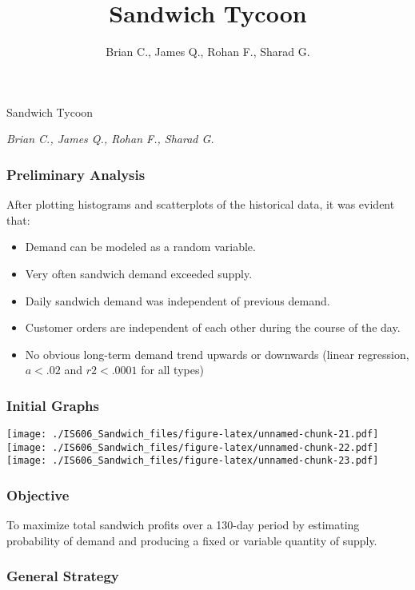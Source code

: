 \documentclass[]{article}
\title{Sandwich Tycoon}
\author{Brian C., James Q., Rohan F., Sharad G.}
\date{}
\begin{document}
\begin{center}
\huge Sandwich Tycoon \\[0.2cm]
\end{center}
\begin{center}
\large \emph{Brian C., James Q., Rohan F., Sharad G.}\\[0.1cm]
\end{center}
\normalsize


\subsubsection{Preliminary Analysis}\label{preliminary-analysis}

After plotting histograms and scatterplots of the historical data, it
was evident that:

\begin{itemize}
\itemsep1pt\parskip0pt
\item
  Demand can be modeled as a random variable.
\item
  Very often sandwich demand exceeded supply.
\item
  Daily sandwich demand was independent of previous demand.
\item
  Customer orders are independent of each other during the course of the
  day.
\item
  No obvious long-term demand trend upwards or downwards (linear
  regression, $a<.02$ and $r2<.0001$ for all types)
\end{itemize}

\subsubsection{Initial Graphs}\label{initial-graphs}

\texttt{[image: ./IS606\_Sandwich\_files/figure-latex/unnamed-chunk-21.pdf]}
\texttt{[image: ./IS606\_Sandwich\_files/figure-latex/unnamed-chunk-22.pdf]}
\texttt{[image: ./IS606\_Sandwich\_files/figure-latex/unnamed-chunk-23.pdf]}

\subsubsection{Objective}\label{objective}

To maximize total sandwich profits over a 130-day period by estimating
probability of demand and producing a fixed or variable quantity of
supply.

\subsubsection{General Strategy}\label{general-strategy}
\end{document}
